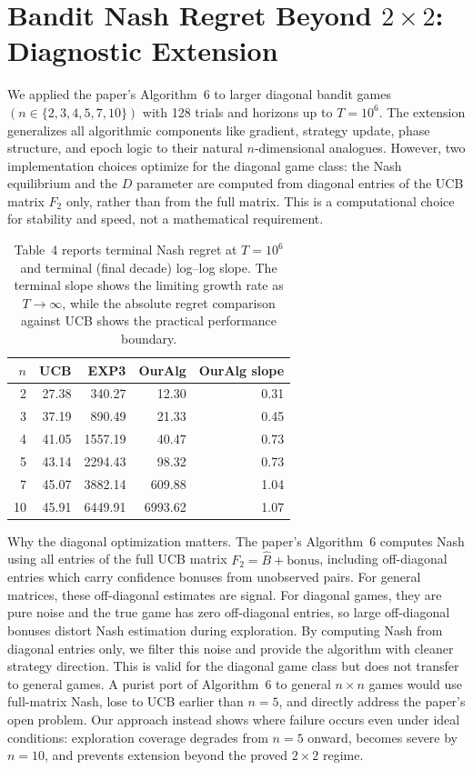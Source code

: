 \documentclass[a4paper,11pt]{article}
\theoremstyle{definition}
\begin{document}
\FloatBarrier

\section{Bandit Nash Regret Beyond $2\times2$: Diagnostic Extension}
We applied the paper's Algorithm~6 to larger diagonal bandit games
$(n \in \{2,3,4,5,7,10\})$ with 128 trials and horizons up to
$T = 10^6$. The extension generalizes all algorithmic components like
gradient, strategy update, phase structure, and epoch logic to their
natural $n$-dimensional analogues. However, two implementation choices
optimize for the diagonal game class: the Nash equilibrium and the
$D$ parameter are computed from diagonal entries of the UCB matrix
$F_2$ only, rather than from the full matrix. This is a computational
choice for stability and speed, not a mathematical requirement.


\begin{table}[!htbp]
  \centering
  \small
  \begin{tabular}{rrrrr}
    \toprule
    $n$ & UCB & EXP3 & OurAlg & OurAlg slope \\
    \midrule
    2 & 27.38 & 340.27 & 12.30 & 0.31 \\
    3 & 37.19 & 890.49 & 21.33 & 0.45 \\
    4 & 41.05 & 1557.19 & 40.47 & 0.73 \\
    5 & 43.14 & 2294.43 & 98.32 & 0.73 \\
    7 & 45.07 & 3882.14 & 609.88 & 1.04 \\
    10 & 45.91 & 6449.91 & 6993.62 & 1.07 \\
    \bottomrule
  \end{tabular}
  \caption{Table~4 reports terminal Nash regret at $T = 10^6$ and terminal (final
decade) log--log slope. The terminal slope shows the limiting growth
rate as $T \to \infty$, while the absolute regret comparison against UCB
shows the practical performance boundary.}
  \label{tab:beyond2x2}
\end{table}

Why the diagonal optimization matters. The paper's Algorithm~6 computes
Nash using all entries of the full UCB matrix $F_2 = \hat{B} + \text{bonus}$,
including off-diagonal entries which carry confidence bonuses from
unobserved pairs. For general matrices, these off-diagonal estimates are
signal. For diagonal games, they are pure noise and the true game has zero
off-diagonal entries, so large off-diagonal bonuses distort Nash
estimation during exploration. By computing Nash from diagonal entries
only, we filter this noise and provide the algorithm with cleaner
strategy direction. This is valid for the diagonal game class but does
not transfer to general games. A purist port of Algorithm~6 to general
$n \times n$ games would use full-matrix Nash, lose to UCB earlier than
$n=5$, and directly address the paper's open problem. Our approach
instead shows where failure occurs even under ideal conditions:
exploration coverage degrades from $n=5$ onward, becomes severe by
$n=10$, and prevents extension beyond the proved $2 \times 2$ regime.
\end{document}
